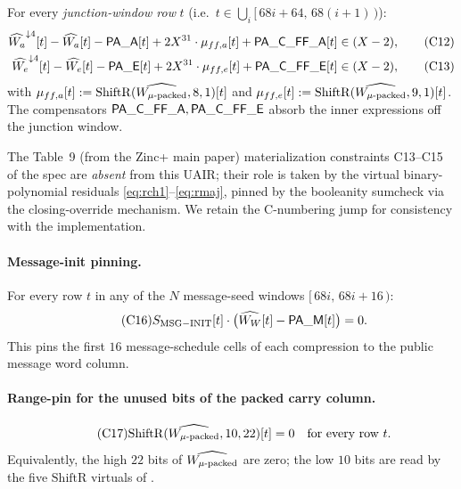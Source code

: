For every \emph{junction-window row} $t$ (i.e.\
$t \in \bigcup_i [\,68i + 64,\,68(i + 1)\,)$):
\begin{align}
\widehat{W_a}^{\downarrow 4}[t] - \widehat{W_a}[t] - \mathsf{PA\_A}[t]
   + 2X^{31} \cdot \mu_{ff,a}[t] + \mathsf{PA\_C\_FF\_A}[t]
   &\in (X-2), \tag{C12}\label{con:ff-a}\\
\widehat{W_e}^{\downarrow 4}[t] - \widehat{W_e}[t] - \mathsf{PA\_E}[t]
   + 2X^{31} \cdot \mu_{ff,e}[t] + \mathsf{PA\_C\_FF\_E}[t]
   &\in (X-2), \tag{C13}\label{con:ff-e}
\end{align}
with $\mu_{ff,a}[t] := \mathrm{ShiftR}(\widehat{W_{\mu\text{-packed}}}, 8, 1)[t]$
and $\mu_{ff,e}[t] := \mathrm{ShiftR}(\widehat{W_{\mu\text{-packed}}}, 9, 1)[t]$.
The compensators $\mathsf{PA\_C\_FF\_A}, \mathsf{PA\_C\_FF\_E}$ absorb
the inner expressions off the junction window.

The Table~9 (from the Zinc+ main paper) materialization constraints C13--C15 of the spec are
\emph{absent} from this UAIR; their role is taken by the virtual
binary-polynomial residuals \eqref{eq:rch1}--\eqref{eq:rmaj},
pinned by the booleanity sumcheck via the closing-override mechanism.
We retain the C-numbering jump for consistency with the implementation.

\paragraph{Message-init pinning.}

For every row $t$ in any of the $N$ message-seed windows
$[\,68i,\,68i+16\,)$:
\begin{equation}\tag{C16}\label{con:msg-init}
S_{\mathrm{MSG-INIT}}[t] \cdot \bigl(\widehat{W_W}[t] - \mathsf{PA\_M}[t]\bigr) = 0.
\end{equation}
This pins the first $16$ message-schedule cells of each compression to
the public message word column.

\paragraph{Range-pin for the unused bits of the packed carry column.}
\begin{equation}\tag{C17}\label{con:mu-zero}
\mathrm{ShiftR}(\widehat{W_{\mu\text{-packed}}}, 10, 22)[t] = 0
\quad \text{for every row } t.
\end{equation}
Equivalently, the high $22$ bits of $\widehat{W_{\mu\text{-packed}}}$ are
zero; the low $10$ bits are read by the five $\mathrm{ShiftR}$ virtuals
of \Cref{rem:mu-budget}.


